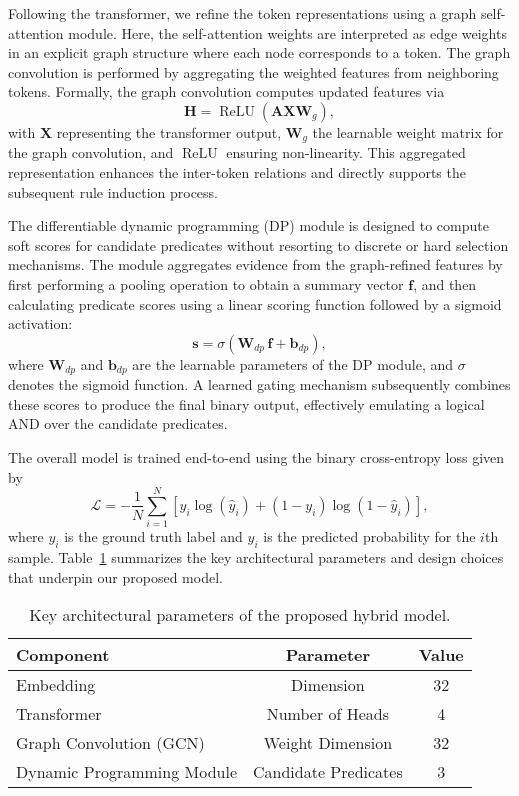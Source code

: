 \documentclass{article}
\begin{document}
Following the transformer, we refine the token representations using a graph self-attention module. Here, the self-attention weights are interpreted as edge weights in an explicit graph structure where each node corresponds to a token. The graph convolution is performed by aggregating the weighted features from neighboring tokens. Formally, the graph convolution computes updated features via
\[
\mathbf{H} = \operatorname{ReLU}\!\left(\mathbf{A}\mathbf{X}\mathbf{W}_{g}\right),
\]
with \(\mathbf{X}\) representing the transformer output, \(\mathbf{W}_{g}\) the learnable weight matrix for the graph convolution, and \(\operatorname{ReLU}\) ensuring non-linearity. This aggregated representation enhances the inter-token relations and directly supports the subsequent rule induction process.

The differentiable dynamic programming (DP) module is designed to compute soft scores for candidate predicates without resorting to discrete or hard selection mechanisms. The module aggregates evidence from the graph-refined features by first performing a pooling operation to obtain a summary vector \(\mathbf{f}\), and then calculating predicate scores using a linear scoring function followed by a sigmoid activation:
\[
\mathbf{s} = \sigma\!\left(\mathbf{W}_{dp}\, \mathbf{f} + \mathbf{b}_{dp}\right),
\]
where \(\mathbf{W}_{dp}\) and \(\mathbf{b}_{dp}\) are the learnable parameters of the DP module, and \(\sigma\) denotes the sigmoid function. A learned gating mechanism subsequently combines these scores to produce the final binary output, effectively emulating a logical AND over the candidate predicates.

The overall model is trained end-to-end using the binary cross-entropy loss given by
\[
\mathcal{L} = -\frac{1}{N}\sum_{i=1}^{N}\left[y_i\log(\hat{y}_i)+(1-y_i)\log(1-\hat{y}_i)\right],
\]
where \(y_i\) is the ground truth label and \(\hat{y}_i\) is the predicted probability for the \(i\)th sample. Table~\ref{tab:method_params} summarizes the key architectural parameters and design choices that underpin our proposed model.

\begin{table}[H]
\centering
\begin{tabular}{lcc}
\hline
Component & Parameter & Value \\
\hline
Embedding & Dimension & 32 \\
Transformer & Number of Heads & 4 \\
Graph Convolution (GCN) & Weight Dimension & 32 \\
Dynamic Programming Module & Candidate Predicates & 3 \\
\hline
\end{tabular}
\caption{Key architectural parameters of the proposed hybrid model.}
\label{tab:method_params}
\end{table}
\end{document}
